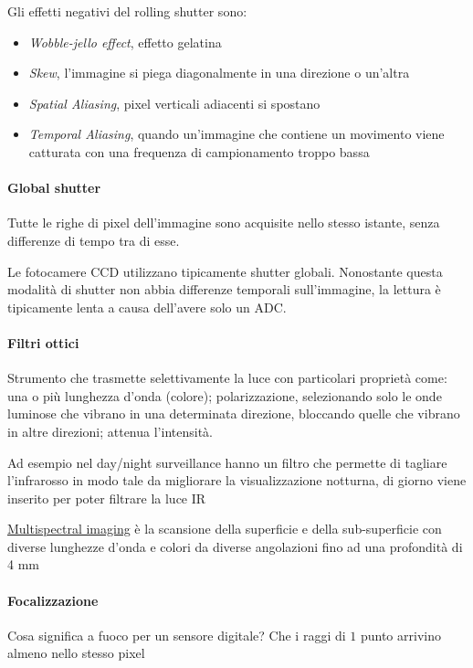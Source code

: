 Gli effetti negativi del rolling shutter sono:
\begin{itemize}
    \item \textit{Wobble-jello effect}, effetto gelatina
    \item \textit{Skew}, l’immagine si piega diagonalmente in una direzione o un’altra
    \item \textit{Spatial Aliasing}, pixel verticali adiacenti si spostano
    \item \textit{Temporal Aliasing}, quando un'immagine che contiene un movimento viene catturata con una frequenza di campionamento troppo bassa
\end{itemize}

\paragraph{Global shutter} 
Tutte le righe di pixel dell'immagine sono acquisite nello stesso istante, senza differenze di tempo tra di esse. 

Le fotocamere CCD utilizzano tipicamente shutter globali. Nonostante questa modalità di shutter non abbia differenze temporali sull'immagine, la lettura è tipicamente lenta a causa dell'avere solo un ADC.

\paragraph{Filtri ottici}
Strumento che trasmette selettivamente la luce con particolari proprietà come: una o più lunghezza d’onda (colore); polarizzazione, selezionando solo le onde luminose che vibrano in una determinata direzione, bloccando quelle che vibrano in altre direzioni; attenua l’intensità.

Ad esempio nel day/night surveillance hanno un filtro che permette di tagliare l’infrarosso in modo tale da migliorare la visualizzazione notturna, di giorno viene inserito per poter filtrare la luce IR

\uline{Multispectral imaging} è la scansione della superficie e della sub-superficie con diverse lunghezze d’onda e colori da diverse angolazioni fino ad una profondità di 4 mm

\paragraph{Focalizzazione}
Cosa significa a fuoco per un sensore digitale? Che i raggi di $1$ punto arrivino almeno nello stesso pixel

